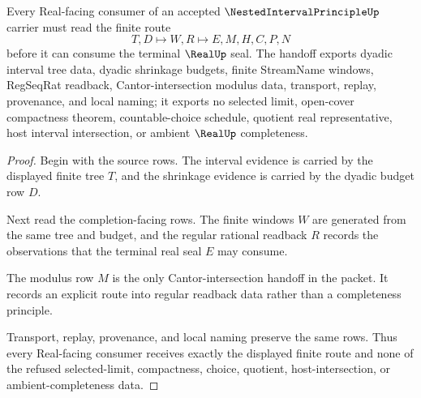 \begin{theorem}
\label{thm:nested-interval-principle-realseal-handoff}
Every Real-facing consumer of an accepted $\NestedIntervalPrincipleUp$ carrier must read the finite route
$$
T,D \longmapsto W,R \longmapsto E,M,H,C,P,N
$$
before it can consume the terminal $\RealUp$ seal. The handoff exports dyadic interval tree data, dyadic shrinkage budgets, finite StreamName windows, RegSeqRat readback, Cantor-intersection modulus data, transport, replay, provenance, and local naming; it exports no selected limit, open-cover compactness theorem, countable-choice schedule, quotient real representative, host interval intersection, or ambient $\RealUp$ completeness.
\end{theorem}
\begin{proof}
Begin with the source rows. The interval evidence is carried by the displayed finite tree $T$, and the shrinkage evidence is carried by the dyadic budget row $D$.

Next read the completion-facing rows. The finite windows $W$ are generated from the same tree and budget, and the regular rational readback $R$ records the observations that the terminal real seal $E$ may consume.

The modulus row $M$ is the only Cantor-intersection handoff in the packet. It records an explicit route into regular readback data rather than a completeness principle.

Transport, replay, provenance, and local naming preserve the same rows. Thus every Real-facing consumer receives exactly the displayed finite route and none of the refused selected-limit, compactness, choice, quotient, host-intersection, or ambient-completeness data.
\end{proof}




